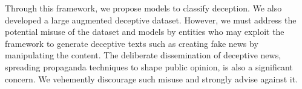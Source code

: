 Through this framework, we propose models to classify deception. We also developed a large augmented deceptive dataset. However, we must address the potential misuse of the dataset and models by entities who may exploit the framework to generate deceptive texts such as creating fake news by manipulating the content. The deliberate dissemination of deceptive news, spreading propaganda techniques to shape public opinion, is also a significant concern. We vehemently discourage such misuse and strongly advise against it.




